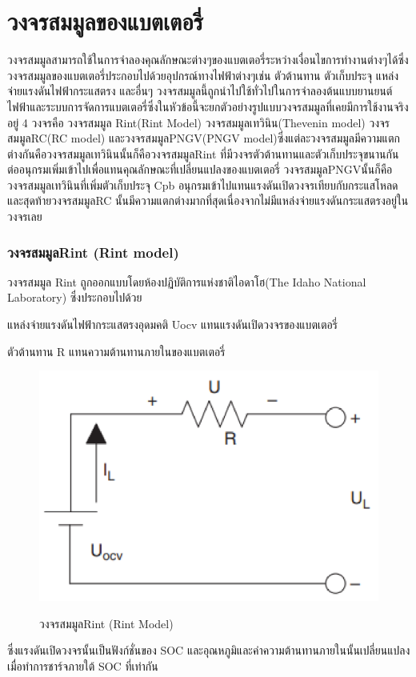 \section{วงจรสมมูลของแบตเตอรี่}
	วงจรสมมูลสามารถใช้ในการจำลองคุณลักษณะต่างๆของแบตเตอรี่ระหว่างเงื่อนไขการทำงานต่างๆได้ซึ่งวงจรสมมูลของแบตเตอรี่ประกอบไปด้วยอุปกรณ์ทางไฟฟ้าต่างๆเช่น ตัวต้านทาน ตัวเก็บประจุ แหล่งจ่ายแรงดันไฟฟ้ากระแสตรง และอื่นๆ วงจรสมมูลนี้ถูกนำไปใช้ทั่วไปในการจำลองต้นแบบยานยนต์ไฟฟ้าและระบบการจัดการแบตเตอรี่ซึ่งในหัวข้อนี้จะยกตัวอย่างรูปแบบวงจรสมมูลที่เคยมีการใช้งานจริงอยู่ 4 วงจรคือ วงจรสมมูล Rint(Rint Model) วงจรสมมูลเทวินิน(Thevenin model) วงจรสมมูลRC(RC model) และวงจรสมมูลPNGV(PNGV model)ซึ่งแต่ละวงจรสมมูลมีความแตกต่างกันคือวงจรสมมูลเทวินินนั้นก็คือวงจรสมมูลRint ที่มีวงจรตัวต้านทานและตัวเก็บประจุขนานกันต่ออนุกรมเพิ่มเข้าไปเพื่อแทนคุณลักษณะที่เปลี่ยนแปลงของแบตเตอรี่ วงจรสมมูลPNGVนั้นก็คือวงจรสมมูลเทวินินที่เพิ่มตัวเก็บประจุ Cpb อนุกรมเข้าไปแทนแรงดันเปิดวงจรเทียบกับกระแสโหลด และสุดท้ายวงจรสมมูลRC นั้นมีความแตกต่างมากที่สุดเนื่องจากไม่มีแหล่งจ่ายแรงดันกระแสตรงอยู่ในวงจรเลย
\subsubsection*{วงจรสมมูลRint (Rint model)}
วงจรสมมูล Rint ถูกออกแบบโดยห้องปฏิบัติการแห่งชาติไอดาโฮ(The Idaho National Laboratory) ซึ่งประกอบไปด้วย
\begin{itemize}
{\item แหล่งจ่ายแรงดันไฟฟ้ากระแสตรงอุดมคติ Uocv แทนแรงดันเปิดวงจรของแบตเตอรี่}
{\item ตัวต้านทาน R แทนความต้านทานภายในของแบตเตอรี่}
\end{itemize}
\begin{center}
	\begin{figure}[H]
		\includegraphics[width=0.6\linewidth]{Chapters/img/Rint_model.png}
			\centering
			\captionsetup{justification=centering,margin=2cm}
			\caption{วงจรสมมูลRint (Rint Model)}
			\cite{jiangzhang2015}
	\end{figure}
\end{center}
ซึ่งแรงดันเปิดวงจรนั้นเป็นฟังก์ชั่นของ SOC และอุณหภูมิและค่าความต้านทานภายในนั้นเปลี่ยนแปลงเมื่อทำการชาร์จภายใต้ SOC ที่เท่ากัน
